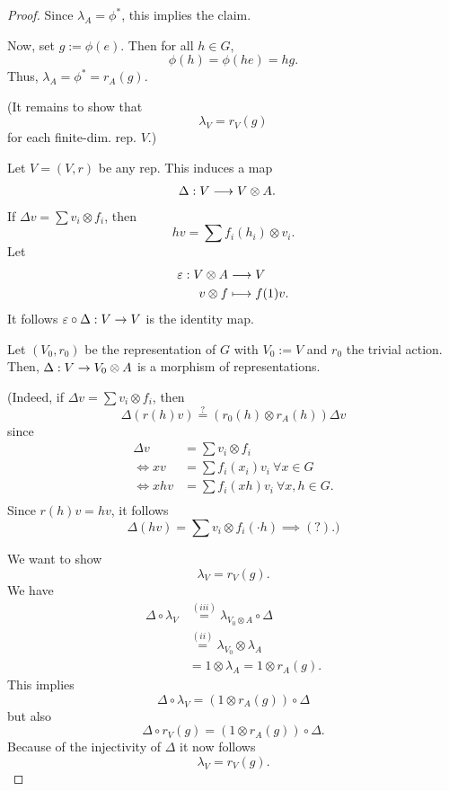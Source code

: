 \begin{proof}
	Since $\lambda_A = \phi^*$, this implies the claim.
	
	Now, set $g := \phi(e)$. Then for all $h \in G$,
	\[ \phi(h) = \phi(he) = hg. \]
	Thus, $\lambda_A = \phi^* = r_A(g)$.
	
	(It remains to show that
	\[ \lambda_V = r_V(g) \]
	for each finite-dim. rep. $V$.)
	
	Let $V = (V,r)$ be any rep. This induces a map
	\begin{align*}
\Delta: V & \overset{}{\longrightarrow}V\otimes  A.
\end{align*}
If $\Delta v = \sum{v_i} \otimes f_i$, then
\[ hv = \sum f_i(h_i) \otimes v_i.  \]
Let \begin{align*}
\varepsilon : V\otimes A & \overset{}{\longrightarrow} V\\
v\otimes f &\longmapsto f(1) v.
\end{align*}
It follows $\varepsilon \circ \Delta : V \overset{}{\rightarrow} V$ is the identity map.


Let $(V_0, r_0)$ be the representation of $G$ with $V_0 := V$ and $r_0$ the trivial action.
Then, $\Delta : V \overset{}{\rightarrow} V_0\otimes A$ is a morphism of representations.

(Indeed, if $\Delta v = \sum v_i \otimes f_i$, then 
\[ \Delta (r(h) v) \overset{?}{=} (r_0(h) \otimes r_A(h) ) \Delta v \]
since
\begin{align*}
\Delta v &= \sum v_i \otimes f_i\\
\iff xv &= \sum f_i(x_i)v_i ~ \forall x \in G\\
\iff xhv &= \sum f_i(xh) v_i ~\forall x,h \in G.\\
\end{align*}
Since $r(h) v = hv$, it follows
\[ \Delta(hv) = \sum v_i \otimes f_i(\cdot h) \implies (?). ) \]


We want to show
\[ \lambda_V = r_V(g). \]
We have
\begin{align*}
\Delta \circ \lambda_V &\overset{(iii)}{=} \lambda_{V_0 \otimes A} \circ \Delta\\
&\overset{(ii)}{=} \lambda_{V_0} \otimes \lambda_A\\
&= 1 \otimes  \lambda_A = 1 \otimes r_A(g).
\end{align*}
This implies
\[ \Delta \circ \lambda_V = (1 \otimes r_A(g)) \circ \Delta \]
but also
\[ \Delta \circ r_V(g) = (1 \otimes r_A(g)) \circ \Delta. \]
Because of the injectivity of $\Delta$ it now follows
\[ \lambda_V = r_V(g). \]
\end{proof}

